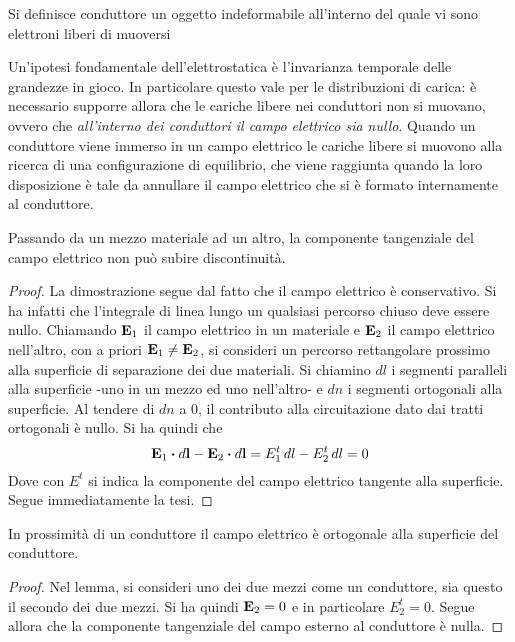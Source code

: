 \begin{defn}[Conduttore]
    Si definisce conduttore un oggetto indeformabile all'interno del quale vi sono elettroni liberi di muoversi
\end{defn}
Un'ipotesi fondamentale dell'elettrostatica è l'invarianza temporale delle grandezze in gioco.
In particolare questo vale per le distribuzioni di carica: è necessario supporre allora che le cariche libere nei conduttori
non si muovano, ovvero che \textit{all'interno dei conduttori il campo elettrico sia nullo}.
Quando un conduttore viene immerso in un campo elettrico le cariche libere si muovono
alla ricerca di una configurazione di equilibrio, che viene raggiunta quando la loro disposizione
è tale da annullare il campo elettrico che si è formato internamente al conduttore.
\begin{thm}
    Passando da un mezzo materiale ad un altro, la componente tangenziale del campo elettrico non può subire discontinuità.
    \label{lemma:discontinuità_E}
\end{thm}
\begin{proof}
    La dimostrazione segue dal fatto che il campo elettrico è conservativo. Si ha infatti che l'integrale di linea
    lungo un qualsiasi percorso chiuso deve essere nullo. Chiamando $\vb{E}_1$ il campo elettrico in un materiale
    e $\vb{E}_2$ il campo elettrico nell'altro, con a priori $\vb{E}_1\neq\vb{E}_2$, si consideri un percorso rettangolare
    prossimo alla superficie di separazione dei due materiali. Si chiamino $dl$ i segmenti paralleli alla superficie
    -uno in un mezzo ed uno nell'altro- e $dn$ i segmenti ortogonali alla superficie. Al tendere di $dn$ a 0,
    il contributo alla circuitazione dato dai tratti ortogonali è nullo. Si ha quindi che
    \[
        \vb{E}_1\vdot d\vb{l} - \vb{E}_2\vdot d\vb{l}=E_1^t\,dl-E_2^t\,dl=0
    \]
    Dove con $E^t$ si indica la componente del campo elettrico tangente alla superficie.
    Segue immediatamente la tesi.
\end{proof}

\begin{cor}
    \label{cor:ortogonalità}
    In prossimità di un conduttore il campo elettrico è ortogonale alla superficie del conduttore.
\end{cor}
\begin{proof}
    Nel lemma, si consideri uno dei due mezzi come un conduttore, sia questo il secondo dei due mezzi.
    Si ha quindi $\vb{E}_2=0$ e in particolare $E_2^t=0$.
    Segue allora che la componente tangenziale del campo esterno al conduttore è nulla.
\end{proof}

